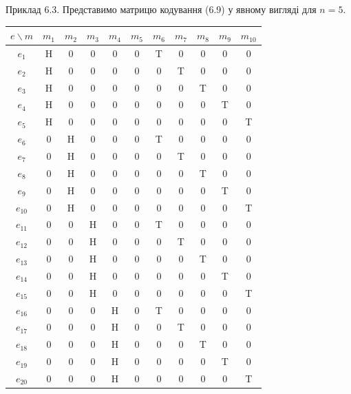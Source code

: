 \begin{example}
    Приклад 6.3. Представимо матрицю кодування (6.9) у явному вигляді для $n = 5$.

    \begin{center}
        \begin{tabular}{|c|c|c|c|c|c|c|c|c|c|c|}
            \hline
            $e \backslash m$ & $m_1$ & $m_2$ & $m_3$ & $m_4$ & $m_5$ & $m_6$ & $m_7$ & $m_8$ & $m_9$ & $m_{10}$ \\\hline
            $e_{1}$ & H & 0 & 0 & 0 & 0 & T & 0 & 0 & 0 & 0 \\\hline
            $e_{2}$ & H & 0 & 0 & 0 & 0 & 0 & T & 0 & 0 & 0 \\\hline
            $e_{3}$ & H & 0 & 0 & 0 & 0 & 0 & 0 & T & 0 & 0 \\\hline
            $e_{4}$ & H & 0 & 0 & 0 & 0 & 0 & 0 & 0 & T & 0 \\\hline
            $e_{5}$ & H & 0 & 0 & 0 & 0 & 0 & 0 & 0 & 0 & T \\\hline
            $e_{6}$ & 0 & H & 0 & 0 & 0 & T & 0 & 0 & 0 & 0 \\\hline
            $e_{7}$ & 0 & H & 0 & 0 & 0 & 0 & T & 0 & 0 & 0 \\\hline
            $e_{8}$ & 0 & H & 0 & 0 & 0 & 0 & 0 & T & 0 & 0 \\\hline
            $e_{9}$ & 0 & H & 0 & 0 & 0 & 0 & 0 & 0 & T & 0 \\\hline
            $e_{10}$ & 0 & H & 0 & 0 & 0 & 0 & 0 & 0 & 0 & T \\\hline
            $e_{11}$ & 0 & 0 & H & 0 & 0 & T & 0 & 0 & 0 & 0 \\\hline
            $e_{12}$ & 0 & 0 & H & 0 & 0 & 0 & T & 0 & 0 & 0 \\\hline
            $e_{13}$ & 0 & 0 & H & 0 & 0 & 0 & 0 & T & 0 & 0 \\\hline
            $e_{14}$ & 0 & 0 & H & 0 & 0 & 0 & 0 & 0 & T & 0 \\\hline
            $e_{15}$ & 0 & 0 & H & 0 & 0 & 0 & 0 & 0 & 0 & T \\\hline
            $e_{16}$ & 0 & 0 & 0 & H & 0 & T & 0 & 0 & 0 & 0 \\\hline
            $e_{17}$ & 0 & 0 & 0 & H & 0 & 0 & T & 0 & 0 & 0 \\\hline
            $e_{18}$ & 0 & 0 & 0 & H & 0 & 0 & 0 & T & 0 & 0 \\\hline
            $e_{19}$ & 0 & 0 & 0 & H & 0 & 0 & 0 & 0 & T & 0 \\\hline
            $e_{20}$ & 0 & 0 & 0 & H & 0 & 0 & 0 & 0 & 0 & T \\\hline

\end{tabular}
\end{center}
\end{example}
